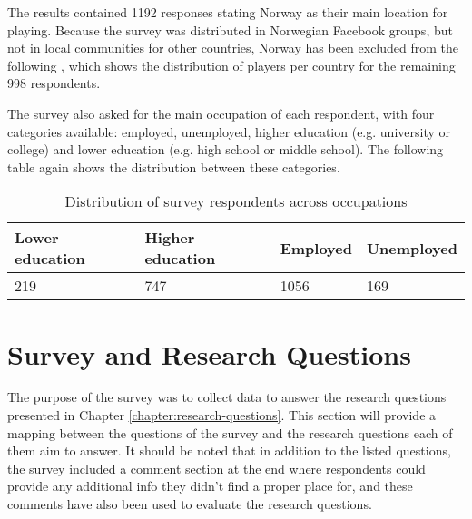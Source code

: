 
The results contained 1192 responses stating Norway as their main location for playing. Because the survey was distributed in Norwegian Facebook groups, but not in local communities for other countries, Norway has been excluded from the following , which shows the distribution of players per country for the remaining 998 respondents.


The survey also asked for the main occupation of each respondent, with four categories available: employed, unemployed, higher education (e.g. university or college) and lower education (e.g. high school or middle school). The following table again shows the distribution between these categories. 

\begin{table}[h]
	\centering
	\label{tbl:survey-occupation-distribution}
	\begin{tabularx}{\textwidth}{|l|l|X|X|}
		\hline
		\textbf{Lower education} & \textbf{Higher education} & \textbf{Employed} & \textbf{Unemployed}\\
		\hline\hline
		
		219 & 747 & 1056 & 169\\
		\hline
	\end{tabularx}
	\caption{Distribution of survey respondents across occupations}
\end{table}

\section{Survey and Research Questions}

The purpose of the survey was to collect data to answer the research questions presented in Chapter \ref{chapter:research-questions}. This section will provide a mapping between the questions of the survey and the research questions each of them aim to answer. It should be noted that in addition to the listed questions, the survey included a comment section at the end where respondents could provide any additional info they didn't find a proper place for, and these comments have also been used to evaluate the research questions.

